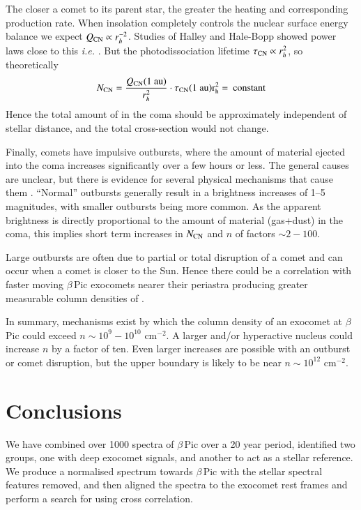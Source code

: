 \documentclass{aa}
\newcommand{\bp}{$\beta$\,Pic}
\begin{document}
The closer a comet to its parent star, the greater the heating and corresponding production rate.
%
When insolation completely controls the nuclear surface energy balance we expect
$Q_{\ce{CN}}\propto r_h^{-2}$.
%
Studies of Halley and Hale-Bopp showed power laws close to this {\it i.e.} \cite{Biver2002}.
%
But the photodissociation lifetime $\tau_{\ce{CN}}\propto r_h^{2}$, so theoretically
$$N_{\ce{CN}}=\frac{Q_{\ce{CN}}(1~\rm{au})}{r_h^2}\cdot  \tau_{\ce{CN}} (1~\rm{au}) r_h^2 =\:{\rm constant} $$
Hence the total amount of  in the coma should be approximately independent of stellar distance, and the total cross-section would not change.

Finally, comets have impulsive outbursts, where the amount of material ejected into the coma increases significantly over a few hours or less.
%
The general causes are unclear, but there is evidence for several physical mechanisms that cause them 
\citep{Kelley2021,Muller2024}.
``Normal'' outbursts generally result in a brightness increases of 1--5 magnitudes, with smaller outbursts being more common.
%
As the apparent brightness is directly proportional to the amount of material (gas+dust) in the coma, this implies short term increases in $N_{\ce{CN}}$ and $n$ of factors $\sim 2-100$.

Large outbursts are often due to partial or total disruption of a comet and can occur when a comet is closer to the Sun.
%
Hence there could be a correlation with faster moving \bp{} exocomets nearer their periastra producing greater measurable column densities of .

In summary, mechanisms exist by which the  column density of an exocomet at \bp{} could exceed $n\sim10^9-10^{10}$ cm$^{-2}$.
%
A larger and/or hyperactive nucleus could increase $n$ by a factor of ten.
%
Even larger increases are possible with an outburst or comet disruption, but the upper boundary is likely to be near $n\sim10^{12}$ cm$^{-2}$. 

\section{Conclusions}\label{sec:conclusion}

We have combined over 1000 spectra of \bp{} over a 20 year period, identified two groups, one with deep exocomet signals, and another to act as a stellar reference.
%
We produce a normalised spectrum towards \bp{} with the stellar spectral features removed, and then aligned the spectra to the exocomet rest frames and perform a search for  using cross correlation.
\end{document}
